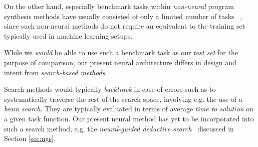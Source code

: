 \documentclass{article}
\begin{document}
On the other hand, especially benchmark tasks within \emph{non-neural} program synthesis methods have usually consisted of only a limited number of tasks%
~\citep{myth,lambda2,typedmil,houdini,tamandu,dilp,terpret},
since such non-neural methods do not require an equivalent to the training set typically used in machine learning setups.





While we \emph{would} be able to use such a benchmark task as our \emph{test set} for the purpose of comparison,
our present neural architecture differs in design and intent from \emph{search-based methods}.

Search methods would typically \emph{backtrack} in case of errors such as to systematically traverse the rest of the search space,
involving e.g. the use of a \emph{beam search}.
They are typically evaluated in terms of average \emph{time to solution} on a given task function.
Our present neural method has yet to be incorporated into such a search method,
e.g. the \emph{neural-guided deductive search}~\citep{deepcoder} discussed in Section \ref{sec:ngs}.
\end{document}
